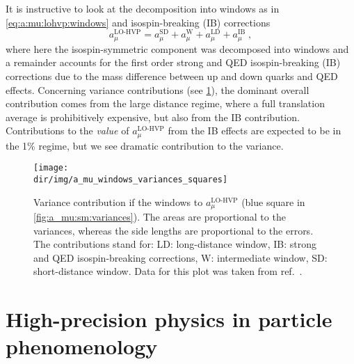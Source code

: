 It is instructive to look at the decomposition into windows as in \cref{eq:a:mu:lohvp:windows} and isospin-breaking (IB) corrections
\begin{equation}
a_{\mu}^{\text{LO-HVP}} = a_{\mu}^{\text{SD}} + a_{\mu}^{\text{W}} + a_{\mu}^{\text{LD}} + a_{\mu}^{\text{IB}} \;,
\end{equation}
where here the isospin-symmetric component was decomposed into windows and a remainder accounts for the first order strong and QED isospin-breaking (IB) corrections due to the mass difference between up and down quarks and QED effects.
Concerning variance contributions (see \cref{fig:a_mu:windows:variances}), the dominant overall contribution comes from the large distance regime, where a full translation average is prohibitively expensive, but also from the IB contribution.
Contributions to the \emph{value} of $a_{\mu}^{\text{LO-HVP}}$ from the IB effects are expected to be in the 1\% regime, but we see dramatic contribution to the variance.
\begin{figure}
\centering
\texttt{[image: \\dir/img/a\_mu\_windows\_variances\_squares]}
\caption{
Variance contribution if the windows to $a_{\mu}^{\text{LO-HVP}}$ (blue square in \cref{fig:a_mu:sm:variances}).
The areas are proportional to the variances, whereas the side lengths are proportional to the errors.
The contributions stand for: LD: long-distance window, IB: strong and QED isospin-breaking corrections, W: intermediate window, SD: short-distance window.
Data for this plot was taken from ref.~\cite{snowmass:2025}.
}
\label{fig:a_mu:windows:variances}
\end{figure}





















\section{High-precision physics in particle phenomenology}

